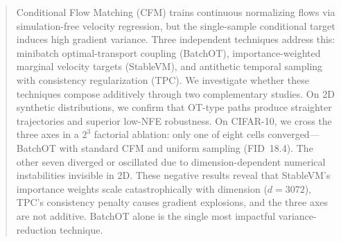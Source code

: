 \begin{abstract}
Conditional Flow Matching (CFM) trains continuous normalizing flows via simulation-free velocity regression, but the single-sample conditional target induces high gradient variance. Three independent techniques address this: minibatch optimal-transport coupling (BatchOT), importance-weighted marginal velocity targets (StableVM), and antithetic temporal sampling with consistency regularization (TPC). We investigate whether these techniques compose additively through two complementary studies. On 2D synthetic distributions, we confirm that OT-type paths produce straighter trajectories and superior low-NFE robustness. On CIFAR-10, we cross the three axes in a $2^3$ factorial ablation: only one of eight cells converged---BatchOT with standard CFM and uniform sampling (FID~18.4). The other seven diverged or oscillated due to dimension-dependent numerical instabilities invisible in 2D. These negative results reveal that StableVM's importance weights scale catastrophically with dimension ($d{=}3072$), TPC's consistency penalty causes gradient explosions, and the three axes are not additive. BatchOT alone is the single most impactful variance-reduction technique.
\end{abstract}
